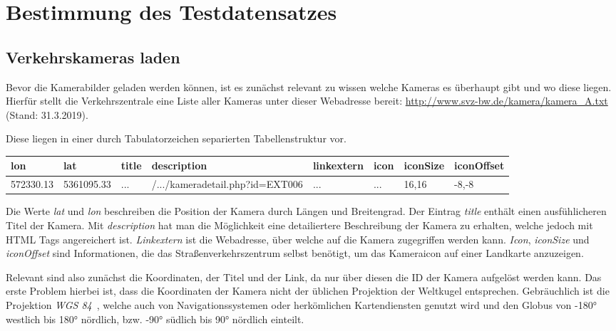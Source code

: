\section{Bestimmung des Testdatensatzes}
\subsection{Verkehrskameras laden}
\label{sec:AnaCam}
Bevor die Kamerabilder geladen werden können, ist es zunächst relevant zu wissen welche Kameras es überhaupt gibt und wo diese liegen.
Hierfür stellt die Verkehrszentrale eine Liste aller Kameras unter dieser Webadresse bereit: \url{http://www.svz-bw.de/kamera/kamera_A.txt} (Stand: 31.3.2019).

Diese liegen in einer durch Tabulatorzeichen separierten Tabellenstruktur vor.

\begin{center}
\scriptsize
    \begin{tabular}{ | l | l | l | l | l | l | l | l |}
    \hline
		lon & lat & title & description & linkextern & icon & iconSize & iconOffset \\ \hline
    572330.13 &
		5361095.33 &
		... &
		/.../kameradetail.php?id=EXT006 &
		... &
		... &
		16,16 &
		-8,-8 \\
    \hline
    \end{tabular}
\end{center}

Die Werte {\em lat} und {\em lon} beschreiben die Position der Kamera durch Längen und Breitengrad.
Der Eintrag {\em title} enthält einen ausfühlicheren Titel der Kamera. Mit {\em description} hat man die Möglichkeit eine detailiertere Beschreibung der Kamera zu erhalten, welche jedoch mit HTML Tags angereichert ist. {\em Linkextern} ist die Webadresse, über welche auf die Kamera zugegriffen werden kann. {\em Icon}, {\em iconSize} und {\em iconOffset} sind Informationen, die das Straßenverkehrszentrum selbst benötigt, um das Kameraicon auf einer Landkarte anzuzeigen.

Relevant sind also zunächst die Koordinaten, der Titel und der Link, da nur über diesen die ID der Kamera aufgelöst werden kann.
Das erste Problem hierbei ist, dass die Koordinaten der Kamera nicht der üblichen Projektion der Weltkugel entsprechen. Gebräuchlich ist die Projektion {\em WGS 84}~\cite{wgs84}, welche auch von Navigationssystemen oder herkömlichen Kartendiensten genutzt wird und den Globus von -180° westlich bis 180° nördlich, bzw. -90° südlich bis 90° nördlich einteilt.

